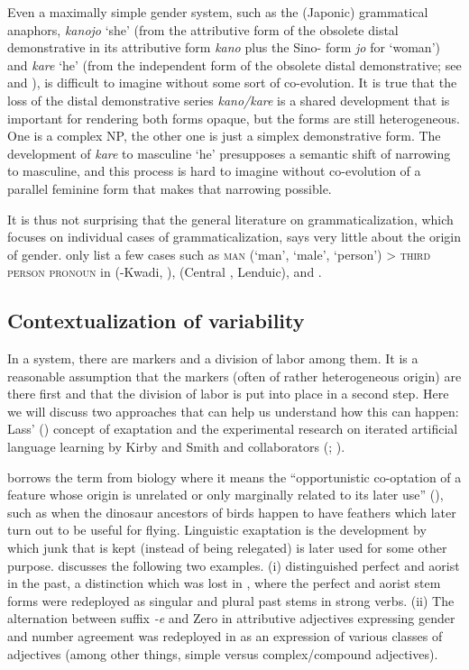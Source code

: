 \documentclass[output=collectionpaper]{langsci/langscibook}
\begin{document}
Even a maximally simple gender system, such as the  (Japonic) grammatical anaphors, \textit{kanojo} `she' (from the attributive form of the obsolete distal demonstrative in its attributive form \textit{kano} plus the Sino- form \textit{jo} for `woman') and \textit{kare} `he' (from the independent form of the obsolete distal demonstrative; see \citealt{Ishiyama2008} and ), is difficult to imagine without some sort of co-evolution. It is true that the loss of the distal demonstrative series \textit{kano/kare} is a shared development that is important for rendering both forms opaque, but the forms are still heterogeneous. One is a complex NP, the other one is just a simplex demonstrative form. The development of \textit{kare} to masculine `he' presupposes a semantic shift of narrowing to masculine, and this process is hard to imagine without co-evolution of a parallel feminine form that makes that narrowing possible.

It is thus not surprising that the general literature on grammaticalization, which focuses on individual cases of grammaticalization, says very little about the origin of gender. \cite{Heine2002} only list a few cases such as \textsc{man} (`man', `male', `person') > \textsc{third person pronoun} in  (-Kwadi, ),  (Central , Lenduic), and .


  \subsection{Contextualization of variability}
  \label{sec:WDG:10.3}

In a system, there are markers and a division of labor among them. It is a reasonable assumption that the markers (often of rather heterogeneous origin) are there first and that the division of labor is put into place in a second step. Here we will discuss two approaches that can help us understand how this can happen: Lass' (\citealt*{Lass1990}) concept of exaptation and the experimental research on iterated artificial language learning by Kirby and Smith and collaborators (\citealt{Kirby2008}; \citealt{Smith2010}).

\cite{Lass1990} borrows the term  from biology where it means the ``opportunistic co-optation of a feature whose origin is unrelated or only marginally related to its later use'' (\citealt[80]{Lass1990}), such as when the dinosaur ancestors of birds happen to have feathers which later turn out to be useful for flying. Linguistic exaptation is the development by which junk that is kept (instead of being relegated) is later used for some other purpose. \cite{Lass1990} discusses the following two examples. (i)  distinguished perfect and aorist in the past, a distinction which was lost in , where the perfect and aorist stem forms were redeployed as singular and plural past stems in strong verbs. (ii) The  alternation between suffix \textit{-e} and Zero in attributive adjectives expressing gender and number agreement was redeployed in  as an expression of various classes of adjectives (among other things, simple versus complex/compound adjectives).
\end{document}
